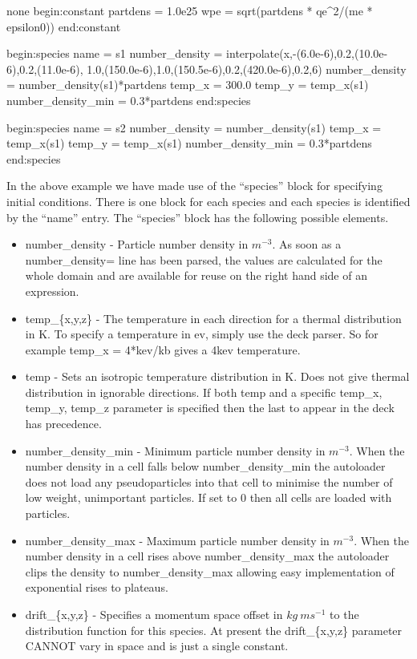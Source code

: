 \begin{nbboxverbatim}{none}
begin:constant
   partdens = 1.0e25
   wpe = sqrt(partdens * qe^2/(me * epsilon0))
end:constant

begin:species
   name = s1
   number_density = interpolate(x,-(6.0e-6),0.2,(10.0e-6),0.2,(11.0e-6),
            1.0,(150.0e-6),1.0,(150.5e-6),0.2,(420.0e-6),0.2,6)
   number_density = number_density(s1)*partdens
   temp_x = 300.0
   temp_y = temp_x(s1)
   number_density_min = 0.3*partdens
end:species

begin:species
   name = s2
   number_density = number_density(s1)
   temp_x = temp_x(s1)
   temp_y = temp_x(s1)
   number_density_min = 0.3*partdens
end:species
\end{nbboxverbatim}

In the above example we have made use of the ``species'' block for specifying
initial conditions. There is one block for each species
and each species is identified by the ``name'' entry.
The ``species'' block has the following possible elements.
\begin{itemize}
\item number\_density - Particle number density in $m^{-3}$. 
  As soon as a number\_density= line has been parsed, the values are
  calculated for the whole domain and are available for reuse on the right hand
  side of an expression.
\item temp\_\{x,y,z\} - The temperature in each direction for a thermal
  distribution in K. To specify a temperature in ev, simply use the deck
  parser. So for example temp\_x = 4*kev/kb gives a 4kev temperature.
\item temp - Sets an isotropic temperature distribution in K. Does not give
  thermal distribution in ignorable directions. If both temp and a specific
  temp\_x, temp\_y, temp\_z parameter is specified then the last to appear in
  the deck has precedence.
\item number\_density\_min - Minimum particle number density in $m^{-3}$.
  When the number density in a cell falls below number\_density\_min the
  autoloader does not load any
  pseudoparticles into that cell to minimise the number of low weight,
  unimportant particles. If set to 0 then all cells are loaded with particles.
\item number\_density\_max - Maximum particle number density in $m^{-3}$. When
  the number density in a cell rises above number\_density\_max the autoloader
  clips the density to number\_density\_max allowing easy implementation of
  exponential rises to plateaus.
\item drift\_\{x,y,z\} - Specifies a momentum space offset in $kg\ ms^{-1}$ to
  the distribution function for this species. At present the drift\_\{x,y,z\}
  parameter CANNOT vary in space and is just a single constant.
\end{itemize}

